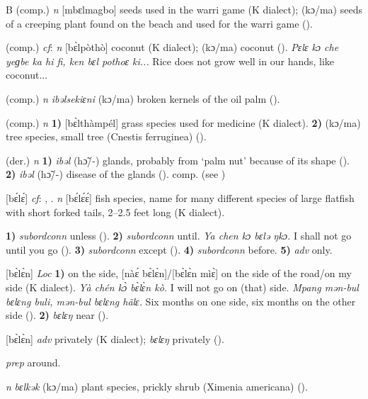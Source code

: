 \begin{letter}{B}
 (comp.) \textit{n} [mbɛlmagbo] seeds used in the warri game (K dialect); (kɔ/ma) seeds of a creeping plant found on the beach and used for the warri game (\citealt{Pichl1967}).

 (comp.) \textit{cf}:  \textit{n} [bɛ̀lpòthò] coconut (K dialect); (kɔ/ma) coconut (\citealt{Pichl1967}). \textit{Pɛlɛ kɔ che yeɡbe ka hi fi, ken bɛl pothoɛ ki...} Rice does not grow well in our hands, like coconut... 

 (comp.) \textit{n} \textit{ibəlsekiɛni} (kɔ/ma) broken kernels of the oil palm (\citealt{Pichl1967}).

 (comp.) \textit{n} \textbf{1)} [bɛ̀lthàmpél] grass species used for medicine (K dialect). \textbf{2)} (kɔ/ma) tree species, small tree (Cnestis ferruginea) (\citealt{Pichl1967}).

 (der.) \textit{n} \textbf{1)} \textit{ibəl} (hɔ̃/-) glands, probably from ‘palm nut' because of its shape (\citealt{Pichl1967}). \textbf{2)} \textit{ibəl} (hɔ̃/-) disease of the glands (\citealt{Pichl1967}). comp.  (see ) 

 [bɛ́lɛ́] \textit{cf}: , . \textit{n} [bɛ́lɛ́ɛ́] fish species, name for many different species of large flatfish with short forked tails, 2--2.5 feet long (K dialect). 

 \textbf{1)} \textit{subordconn} unless (\citealt{Sumner1921}). \textbf{2)} \textit{subordconn} until. \textit{Ya chen kɔ bɛlə ŋkɔ.} I shall not go until you go (\citealt{Pichl1967}). \textbf{3)} \textit{subordconn} except (\citealt{Pichl1967}). \textbf{4)} \textit{subordconn} before. \textbf{5)} \textit{adv} only.

 [bɛ̀lɛ̀n] \textit{Loc} \textbf{1)} on the side, [nàɛ́ bɛ̀lɛ̀n]/[bɛ̀lɛ̀n mìɛ̀] on the side of the road/on my side (K dialect). \textit{Yà chén kɔ̀ bɛ̀lɛ̀n kò.} I will not go on (that) side. \textit{Mpang mən-bul bɛlɛng buli, mən-bul bɛlɛng hãlɛ.} Six months on one side, six months on the other side (\citealt{Pichl1967}). \textbf{2)} \textit{bɛlɛŋ} near (\citealt{Pichl1967}).

 [bɛ̀lɛ̀n] \textit{adv} privately (K dialect); \textit{bɛlɛŋ} privately (\citealt{Pichl1967}).

 \textit{prep} around.

 \textit{n} \textit{bɛlkək} (kɔ/ma) plant species, prickly shrub (Ximenia americana) (\citealt{Pichl1967}). 


\end{letter}
